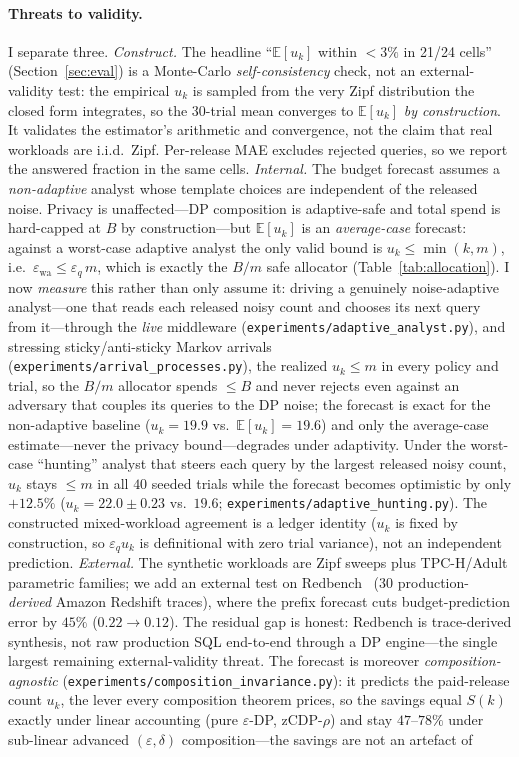 \documentclass[sigconf,nonacm]{acmart}
\newcommand{\eps}{\varepsilon}
\newcommand{\E}{\mathbb{E}}
\begin{document}
\paragraph{Threats to validity.} I separate three. \emph{Construct.} The headline ``$\E[u_k]$ within $<3\%$ in 21/24 cells'' (Section~\ref{sec:eval}) is a Monte-Carlo \emph{self-consistency} check, not an external-validity test: the empirical $u_k$ is sampled from the very Zipf distribution the closed form integrates, so the $30$-trial mean converges to $\E[u_k]$ \emph{by construction}. It validates the estimator's arithmetic and convergence, not the claim that real workloads are i.i.d.\ Zipf. Per-release MAE excludes rejected queries, so we report the answered fraction in the same cells. \emph{Internal.} The budget forecast assumes a \emph{non-adaptive} analyst whose template choices are independent of the released noise. Privacy is unaffected---DP composition is adaptive-safe and total spend is hard-capped at $B$ by construction---but $\E[u_k]$ is an \emph{average-case} forecast: against a worst-case adaptive analyst the only valid bound is $u_k\le\min(k,m)$, i.e.\ $\eps_{\mathrm{wa}}\le\eps_q\,m$, which is exactly the $B/m$ safe allocator (Table~\ref{tab:allocation}). I now \emph{measure} this rather than only assume it: driving a genuinely noise-adaptive analyst---one that reads each released noisy count and chooses its next query from it---through the \emph{live} middleware (\texttt{experiments/adaptive\_analyst.py}), and stressing sticky/anti-sticky Markov arrivals (\texttt{experiments/arrival\_processes.py}), the realized $u_k\le m$ in every policy and trial, so the $B/m$ allocator spends $\le B$ and never rejects even against an adversary that couples its queries to the DP noise; the forecast is exact for the non-adaptive baseline ($u_k{=}19.9$ vs.\ $\E[u_k]{=}19.6$) and only the average-case estimate---never the privacy bound---degrades under adaptivity. Under the worst-case ``hunting'' analyst that steers each query by the largest released noisy count, $u_k$ stays $\le m$ in all $40$ seeded trials while the forecast becomes optimistic by only $+12.5\%$ ($u_k{=}22.0{\pm}0.23$ vs.\ $19.6$; \texttt{experiments/adaptive\_hunting.py}). The constructed mixed-workload agreement is a ledger identity ($u_k$ is fixed by construction, so $\eps_q u_k$ is definitional with zero trial variance), not an independent prediction. \emph{External.} The synthetic workloads are Zipf sweeps plus TPC-H/Adult parametric families; we add an external test on Redbench~\cite{redbench2025} ($30$ production-\emph{derived} Amazon Redshift traces), where the prefix forecast cuts budget-prediction error by $45\%$ ($0.22\!\to\!0.12$). The residual gap is honest: Redbench is trace-derived synthesis, not raw production SQL end-to-end through a DP engine---the single largest remaining external-validity threat. The forecast is moreover \emph{composition-agnostic} (\texttt{experiments/composition\_invariance.py}): it predicts the paid-release count $u_k$, the lever every composition theorem prices, so the savings equal $S(k)$ exactly under linear accounting (pure $\eps$-DP, zCDP-$\rho$) and stay $47$--$78\%$ under sub-linear advanced $(\eps,\delta)$ composition---the savings are not an artefact of 
\end{document}
